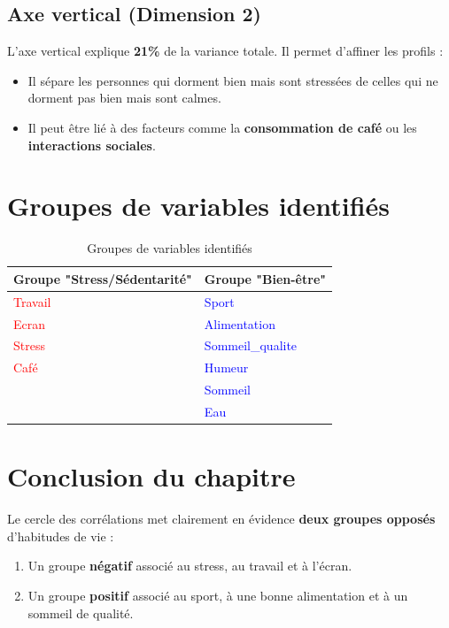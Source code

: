 \documentclass[12pt,a4paper]{book}
\begin{document}
	\subsection{Axe vertical (Dimension 2)}
	
	L'axe vertical explique \textbf{21\%} de la variance totale. Il permet d'affiner les profils :
	
	\begin{itemize}
		\item Il sépare les personnes qui dorment bien mais sont stressées de celles qui ne dorment pas bien mais sont calmes.
		\item Il peut être lié à des facteurs comme la \textbf{consommation de café} ou les \textbf{interactions sociales}.
	\end{itemize}
	
	\section{Groupes de variables identifiés}
	
	\begin{table}[H]
		\centering
		\caption{Groupes de variables identifiés}
		\begin{tabular}{p{5cm}p{5cm}}
			\toprule
			\textbf{Groupe "Stress/Sédentarité"} & \textbf{Groupe "Bien-être"} \\
			\midrule
			\textcolor{red}{Travail} & \textcolor{blue}{Sport} \\
			\textcolor{red}{Ecran} & \textcolor{blue}{Alimentation} \\
			\textcolor{red}{Stress} & \textcolor{blue}{Sommeil\_qualite} \\
			\textcolor{red}{Café} & \textcolor{blue}{Humeur} \\
			& \textcolor{blue}{Sommeil} \\
			& \textcolor{blue}{Eau} \\
			\bottomrule
		\end{tabular}
	\end{table}
	
	\section{Conclusion du chapitre}
	
	Le cercle des corrélations met clairement en évidence \textbf{deux groupes opposés} d'habitudes de vie :
	
	\begin{enumerate}
		\item Un groupe \textbf{négatif} associé au stress, au travail et à l'écran.
		\item Un groupe \textbf{positif} associé au sport, à une bonne alimentation et à un sommeil de qualité.
	\end{enumerate}
	
\end{document}
